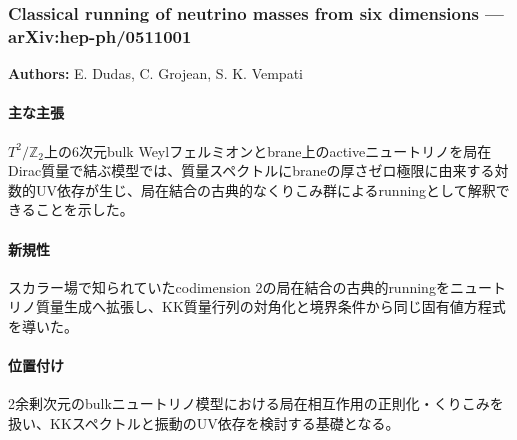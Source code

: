 \subsubsection{Classical running of neutrino masses from six dimensions --- arXiv:hep-ph/0511001}

\textbf{Authors:} E. Dudas, C. Grojean, S. K. Vempati

\paragraph{主な主張}
$T^2/\mathbb{Z}_2$上の6次元bulk Weylフェルミオンとbrane上のactiveニュートリノを局在Dirac質量で結ぶ模型では、質量スペクトルにbraneの厚さゼロ極限に由来する対数的UV依存が生じ、局在結合の古典的なくりこみ群によるrunningとして解釈できることを示した\cite{Dudas:2005ClassicalRunning}。

\paragraph{新規性}
スカラー場で知られていたcodimension 2の局在結合の古典的runningをニュートリノ質量生成へ拡張し、KK質量行列の対角化と境界条件から同じ固有値方程式を導いた。

\paragraph{位置付け}
2余剰次元のbulkニュートリノ模型における局在相互作用の正則化・くりこみを扱い、KKスペクトルと振動のUV依存を検討する基礎となる。
